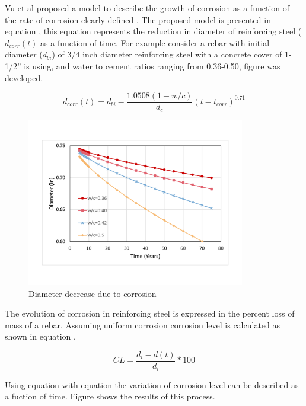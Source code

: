 Vu et al proposed a model to describe the growth of corrosion as a function of the rate of corrosion clearly defined \cite{Vu2000}\cite{Stewart1998}\cite{Choe2008}\cite{Ghosh2010}. The proposed model is presented in equation , this equation represents the reduction in diameter of reinforcing steel ($d_{corr}(t)$ as a function of time. For example consider a rebar with initial diameter ($d_{bi}$) of 3/4 inch diameter reinforcing steel with a concrete cover of 1-1/2” is using, and water to cement ratios ranging from 0.36-0.50, figure  was developed.

\begin{equation}
  d_{corr}(t)=d_{bi}-\frac{1.0508(1-w/c)}{d_c} (t-t_{corr})^{0.71}
  \label{eq.CorrosionEvolution}
\end{equation} 

\begin{figure}[htbp]
\centering
\includegraphics[width=0.85\textwidth]{Chapter-2/figs/DiameterDecrease}
\caption{Diameter decrease due to corrosion}
\label{fig:DiameterEvolution}
\end{figure}

The evolution of corrosion in reinforcing steel is expressed in the percent loss of mass of a rebar. Assuming uniform corrosion corrosion level is calculated as shown in equation .

\begin{equation}
	CL=\frac{d_{i}-d(t)}{d_{i}}*100%
  \label{eq.CorrosionLevel}
\end{equation} 

Using equation  with equation   the variation of corrosion level can be described as a fuction of time. Figure   shows the results of this process.

